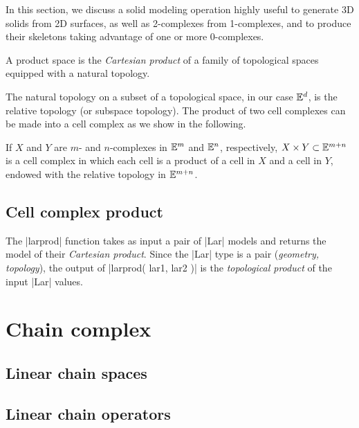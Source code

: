 In this section, we discuss a solid modeling operation highly useful to generate 3D solids from 2D surfaces, as well as 2-complexes from 1-complexes, and to produce their skeletons taking advantage of one or more 0-complexes.

\begin{definition}
A product space is the \emph{Cartesian product} of a family of topological spaces equipped with a natural topology.
\end{definition}

The natural topology on a subset of a topological space, in our case $\mathbb{E}^d$, is the relative topology (or subspace topology).
The product of two cell complexes can be made into a cell complex as we show in the following. 

\begin{definition}
If $X$ and $Y$ are  $m$- and $n$-complexes in $\mathbb{E}^m$ and $\mathbb{E}^n$, respectively,  $X \times Y \subset \mathbb{E}^{m+n}$ is a cell complex in which each cell is a product of a cell in $X$ and a cell in $Y$, endowed with the relative topology in $\mathbb{E}^{m+n}$.
\end{definition}

\subsection{Cell complex product}
\label{subsec:6:cell-product}

\begin{definition}[larprod]
The |larprod| function takes as input a pair of |Lar| models and returns the model of their \emph{Cartesian product}. Since the |Lar| type is a pair (\emph{geometry, topology}), the 
output of |larprod( lar1, lar2 )| is the \emph{topological product} of the input |Lar| values.
\end{definition}



\section{Chain complex}\label{sect:3-3}

\subsection{Linear chain spaces}\label{sect:3-3-1}


\subsection{Linear chain operators}\label{sect:3-3-2}


